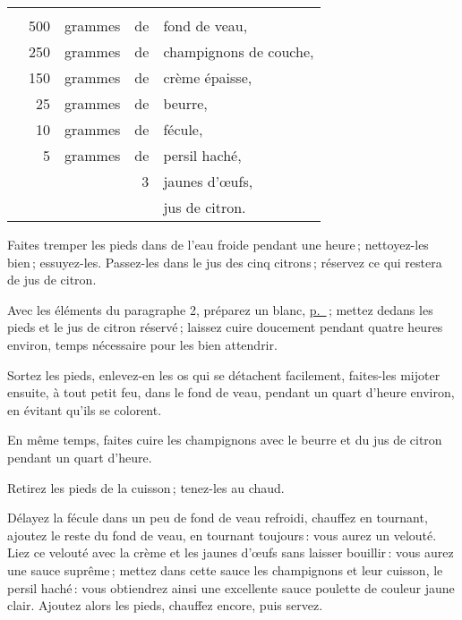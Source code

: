 \begin{tabular}{@{}lrrrp{18em}}
\footnotesize
  &     &         &    &                                                                                  \\
  & 500 & grammes & de & fond de veau,                                                                    \\
  & 250 & grammes & de & champignons de couche,                                                           \\
  & 150 & grammes & de & crème épaisse,                                                                   \\
  &  25 & grammes & de & beurre,                                                                          \\
  &  10 & grammes & de & fécule,                                                                          \\
  &   5 & grammes & de & persil haché,                                                                    \\
  &     &         &  3 & jaunes d'œufs,                                                                   \\
  &     &         &    & jus de citron.                                                                   \\
\end{tabular}
\normalsize

\medskip

Faites tremper les pieds dans de l'eau froide pendant une heure ; nettoyez-les
bien ; essuyez-les. Passez-les dans le jus des cinq citrons ; réservez ce qui
restera de jus de citron.

Avec les éléments du paragraphe 2, préparez un blanc,
\hyperlink{p0425}{p. \pageref{pg0425}} ; mettez dedans les pieds et le jus de
citron réservé ; laissez cuire doucement pendant quatre heures environ, temps
nécessaire pour les bien attendrir.

Sortez les pieds, enlevez-en les os qui se détachent facilement, faites-les mijoter
ensuite, à tout petit feu, dans le fond de veau, pendant un quart d'heure environ,
en évitant qu'ils se colorent.

En même temps, faites cuire les champignons avec le beurre et du jus de citron
pendant un quart d'heure.

Retirez les pieds de la cuisson ; tenez-les au chaud.

Délayez la fécule dans un peu de fond de veau refroidi, chauffez en tournant,
ajoutez le reste du fond de veau, en tournant toujours : vous aurez un velouté.
Liez ce velouté avec la crème et les jaunes d'œufs sans laisser bouillir : vous
aurez une sauce suprême ; mettez dans cette sauce les champignons et leur
cuisson, le persil haché : vous obtiendrez ainsi une excellente sauce poulette
de couleur jaune clair. Ajoutez alors les pieds, chauffez encore, puis servez.

